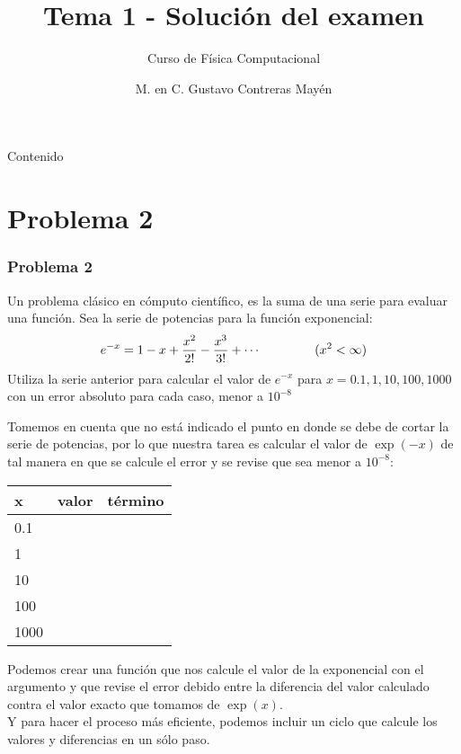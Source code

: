 

\renewcommand {\arraystretch}{1.5}
{
}
\title{Tema 1 - Soluci\'{o}n del examen}
\subtitle{Curso de F\'{i}sica Computacional}
\author{M. en C. Gustavo Contreras May\'{e}n}

\maketitle
\fontsize{14}{14}\selectfont
{}
\begin{frame}{Contenido}
\tableofcontents[pausesections]
\end{frame}
\section{Problema 2}
\begin{frame}
\frametitle{Problema 2}
Un problema cl\'{a}sico en c\'{o}mputo cient\'{i}fico, es la suma de una serie para evaluar una funci\'{o}n. Sea la serie de potencias para la funci\'{o}n exponencial:
\[e^{-x} = 1 - x + \dfrac{x^{2}}{2!} - \dfrac{x^{3}}{3!} +\cdots \hspace{1.5cm} (x^{2} < \infty)  \]
Utiliza la serie anterior para calcular el valor de $e^{-x}$ para $x=0.1,1,10, 100, 1000$ con un error absoluto para cada caso, menor a $10^{-8}$
\end{frame}
\begin{frame}
Tomemos en cuenta que no est\'{a} indicado el punto en donde se debe de cortar la serie de potencias, por lo que nuestra tarea es calcular el valor de $\exp(-x)$ de tal manera en que se calcule el error y se revise que sea menor a $10^{-8}$:
\begin{center}
	\begin{tabular}{l | l | l}
	x & valor & t\'{e}rmino \\ \hline
	0.1 &  &  \\ \hline
	1 &  &  \\ \hline
	10 &  &  \\ \hline
	100 &  &  \\ \hline
	1000 &  &
	\end{tabular}
\end{center}
\end{frame}
\begin{frame}
Podemos crear una funci\'{o}n que nos calcule el valor de la exponencial con el argumento y que revise el error debido entre la diferencia del valor calculado contra el valor exacto que tomamos de $\exp(x)$.
\\
\medskip
Y para hacer el proceso m\'{a}s eficiente, podemos incluir un ciclo que calcule los valores y diferencias en un s\'{o}lo paso.
\end{frame}
